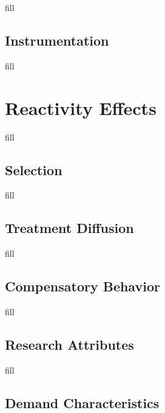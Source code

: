 \documentclass[
  b5paper]{book}
\begin{document}
fill

\hypertarget{instrumentation}{%
\subsection*{Instrumentation}\label{instrumentation}}

fill

\hypertarget{reactivity-effects}{%
\section{Reactivity Effects}\label{reactivity-effects}}

fill

\hypertarget{selection}{%
\subsection*{Selection}\label{selection}}

fill

\hypertarget{treatment-diffusion}{%
\subsection*{Treatment Diffusion}\label{treatment-diffusion}}

fill

\hypertarget{compensatory-behavior}{%
\subsection*{Compensatory Behavior}\label{compensatory-behavior}}

fill

\hypertarget{research-attributes}{%
\subsection*{Research Attributes}\label{research-attributes}}

fill

\hypertarget{demand-characteristics}{%
\subsection*{Demand Characteristics}\label{demand-characteristics}}
\end{document}
